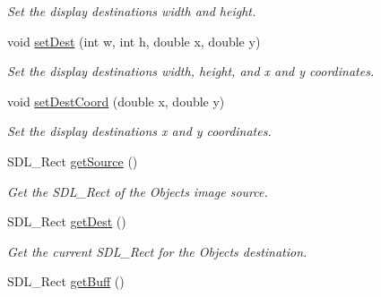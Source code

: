 \begin{DoxyCompactItemize}
\begin{DoxyCompactList}\small\item\em Set the display destinations width and height. \end{DoxyCompactList}\item 
void \hyperlink{classObject_a9338eab393a21158dd0087b3b9d2e5e2}{set\+Dest} (int w, int h, double x, double y)\hypertarget{classObject_a9338eab393a21158dd0087b3b9d2e5e2}{}\label{classObject_a9338eab393a21158dd0087b3b9d2e5e2}

\begin{DoxyCompactList}\small\item\em Set the display destinations width, height, and x and y coordinates. \end{DoxyCompactList}\item 
void \hyperlink{classObject_a92a957d9f65d973c087367d26b358f0b}{set\+Dest\+Coord} (double x, double y)\hypertarget{classObject_a92a957d9f65d973c087367d26b358f0b}{}\label{classObject_a92a957d9f65d973c087367d26b358f0b}

\begin{DoxyCompactList}\small\item\em Set the display destinations x and y coordinates. \end{DoxyCompactList}\item 
S\+D\+L\+\_\+\+Rect \hyperlink{classObject_a411820194b7a02fcec714a51382c0c0c}{get\+Source} ()\hypertarget{classObject_a411820194b7a02fcec714a51382c0c0c}{}\label{classObject_a411820194b7a02fcec714a51382c0c0c}

\begin{DoxyCompactList}\small\item\em Get the S\+D\+L\+\_\+\+Rect of the Objects image source. \end{DoxyCompactList}\item 
S\+D\+L\+\_\+\+Rect \hyperlink{classObject_ab081a97a21c840bbcf3fd8ed3510f71d}{get\+Dest} ()\hypertarget{classObject_ab081a97a21c840bbcf3fd8ed3510f71d}{}\label{classObject_ab081a97a21c840bbcf3fd8ed3510f71d}

\begin{DoxyCompactList}\small\item\em Get the current S\+D\+L\+\_\+\+Rect for the Objects destination. \end{DoxyCompactList}\item 
S\+D\+L\+\_\+\+Rect \hyperlink{classObject_ad6363cce8614921f01b9ed9c1e068f65}{get\+Buff} ()\hypertarget{classObject_ad6363cce8614921f01b9ed9c1e068f65}{}\label{classObject_ad6363cce8614921f01b9ed9c1e068f65}


\end{DoxyCompactItemize}
